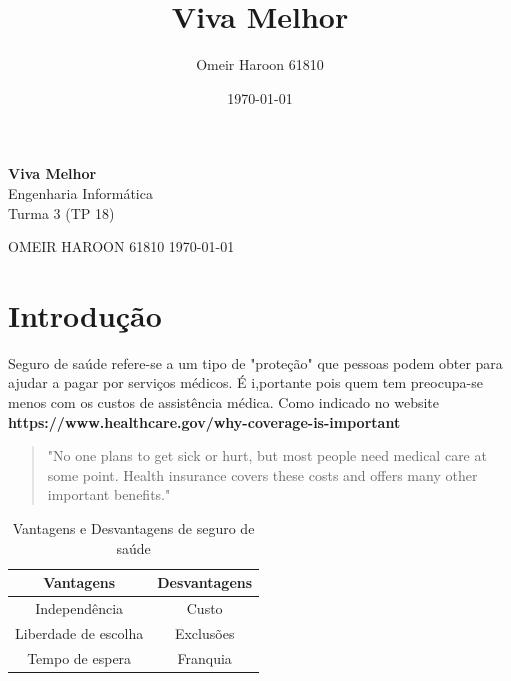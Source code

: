 \documentclass[10pt,a4paper]{article}
\title{Viva Melhor}
\author{Omeir Haroon 61810}
\date{\today}
\begin{document}
\begin{titlepage}
	\begin{center}
	{\Huge\bfseries Viva Melhor}\\
	\vspace{1cm}
	{\Large Engenharia Informática}\\
	\vspace{1cm}
	{\Large Turma 3 (TP 18)}\\
	\end{center}
	\begin{flushright}
	{\Large OMEIR HAROON \Large 61810 \hfill  \large\today}
	\end{flushright}
	\begin{figure}[h]
	\begin{center}
	\end{center}
	\end{figure}
\end{titlepage}


\section{Introdução}
	Seguro de saúde refere-se a um tipo de "proteção"
que pessoas podem obter para ajudar a pagar por serviços médicos. É i,portante pois quem tem preocupa-se menos com os custos de assistência médica.
Como indicado no website {\bfseries https://www.healthcare.gov/why-coverage-is-important}
\begin{quotation}
"No one plans to get sick or hurt, but most people need medical care at some point. Health insurance covers these costs and offers many other important benefits."
\end{quotation}

\begin{table}[h]
	\centering
	\caption{Vantagens e Desvantagens de seguro de saúde}
	\begin{tabular}{|c|c|} 
	\hline
	{\bfseries Vantagens} & {\bfseries Desvantagens}\\
	\hline
	Independência &  Custo\\
	\hline	
	Liberdade de escolha & Exclusões\\
	\hline	
	Tempo de espera  & Franquia\\
	\hline
	\end{tabular}
\end{table}
\newpage
\end{document}
